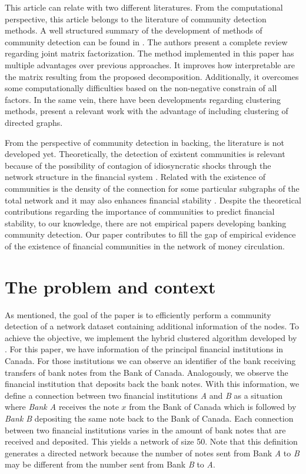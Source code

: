 \documentclass[11pt,letter]{article}%
\numberwithin{equation}{section}
\begin{document}
This article can relate with two different literatures. From the computational perspective, this article belongs to the literature of community detection methods. A well structured summary of the development of methods of community detection can be found in \cite{Du2017}. The authors present a complete review regarding joint matrix factorization. The method implemented in this paper has multiple advantages over previous approaches. It improves how interpretable are the matrix resulting from the proposed decomposition. Additionally, it overcomes some computationally difficulties based on the non-negative constrain of all factors. In the same vein, there have been developments regarding clustering methods, \cite{2018CCod} present a relevant work with the advantage of including clustering of directed graphs.

From the perspective of community detection in backing, the literature is not developed yet. Theoretically, the detection of existent communities is relevant because of the possibility of contagion of idiosyncratic shocks through the network structure in the financial system \citep{Gai2010}. Related with the existence of communities is the density of the connection for some particular subgraphs of the total network and it may also enhances financial stability \citep{acemoglu2015}. Despite the theoretical contributions regarding the importance of communities to predict financial stability, to our knowledge, there are not empirical papers developing banking community detection. Our paper contributes to fill the gap of empirical evidence of the existence of financial communities in the network of money circulation.

\section{The problem and context}

As mentioned, the goal of the paper is to efficiently perform a community detection of a network dataset containing additional information of the nodes. To achieve the objective, we implement the hybrid clustered algorithm developed by \cite{Du2017}. For this paper, we have information of the principal financial institutions in Canada. For those institutions we can observe an identifier of the bank receiving transfers of bank notes from the Bank of Canada. Analogously, we observe the financial institution that deposits back the bank notes. With this information, we define a connection between two financial institutions \textit{A} and \textit{B} as a situation where \textit{Bank A} receives the note $x$ from the Bank of Canada which is followed by \textit{Bank B} depositing the same note back to the Bank of Canada. Each connection between two financial institutions varies in the amount of bank notes that are received and deposited. This yields a network of size 50. Note that this definition generates a directed network because the number of notes sent from Bank \textit{A} to \textit{B} may be different from the number sent from Bank \textit{B} to \textit{A}.
\end{document}
